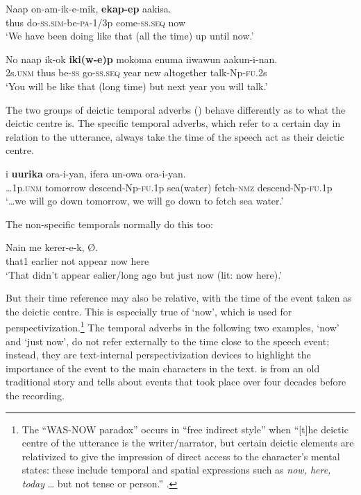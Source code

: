 \ea%
\label{ex:6:x1941}
\gll Naap  on-am-ik-e-mik,  \textbf{ekap-ep} aakisa. \\
thus  do-\textsc{ss}.\textsc{sim}-be-\textsc{pa}-1/3p  come-\textsc{ss}.\textsc{seq}  now\\
\glt `We have been doing like that (all the time) up until now.'
\z

\ea%
\label{ex:6:x1942}
\gll No  naap  ik-ok  \textbf{iki(w-e)p}  mokoma  enuma  iiwawun aakun-i-nan.\\
2s.\textsc{unm}  thus  be-\textsc{ss}  go-\textsc{ss}.\textsc{seq}  year  new  altogether talk-Np-\textsc{fu}.2s\\
\glt `You will be like that (long time) but next year you will talk.'
\z

The two groups of deictic temporal adverbs () behave differently as to what the deictic centre is. The specific temporal adverbs, which refer to a certain day in relation to the utterance, always take the time of the speech act as their deictic centre. 

\ea%
\label{ex:6:x1889}
\gll {\dots}i  \textbf{uurika}  ora-i-yan,  ifera  un-owa ora-i-yan.\\
{\dots}1p.\textsc{unm}  tomorrow  descend-Np-\textsc{fu}.1p  sea(water)  fetch-\textsc{nmz} descend-Np-\textsc{fu}.1p\\
\glt `{\dots}we will go down tomorrow, we will go down to fetch sea water.'
\z

The non-specific temporals normally do this too: 

\ea%
\label{ex:6:x1890}
\gll Nain    me  kerer-e-k,     {\O}. \\
that1  earlier  not  appear  now  here \\
\glt `That didn't appear ealier/long ago but just now (lit: now here).'
\z

But their time reference may also be relative, with the time of the event taken as the deictic centre. This is especially true of  `now', which is used for perspectivization.\footnote{The ``\textsc{WAS-NOW} paradox'' occurs in ``free indirect style'' when ``[t]he deictic centre of the utterance is the writer/narrator, but certain deictic elements are relativized to give the impression of direct access to the character's mental states: these include temporal and spatial expressions such as \textit{now, here, today} {\dots} but not tense or person.'' \citep{MushinEtAl2000}.} The temporal adverbs in the following two examples,  `now' and  `just now', do not refer externally to the time close to the speech event; instead, they are text-internal perspectivization devices to highlight the importance of the event to the main characters in the text.  is from an old traditional story and  tells about events that took place over four decades before the recording. 

